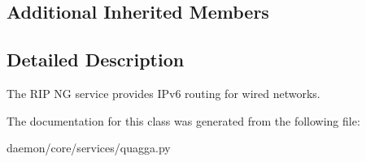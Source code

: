\subsection*{Additional Inherited Members}


\subsection{Detailed Description}
\begin{DoxyVerb}The RIP NG service provides IPv6 routing for wired networks.
\end{DoxyVerb}
 

The documentation for this class was generated from the following file\+:\begin{DoxyCompactItemize}
\item 
daemon/core/services/quagga.\+py\end{DoxyCompactItemize}
